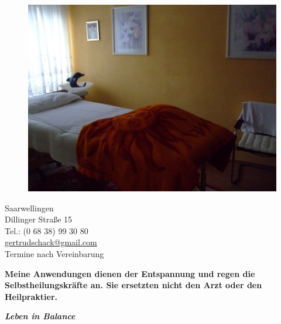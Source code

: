 \documentclass[10pt,foldmark,notumble]{leaflet}
\begin{document}
\begin{figure}[h]
\includegraphics [scale=.25]{Raum_alt.jpg}
\end{figure}


\vspace*{7mm}
\begin{flushleft}
Saarwellingen\\
Dillinger Straße 15\\
Tel.: (0 68 38) 99 30 80\\
\href{mailto:gertrudschack@gmail.com}{gertrudschack@gmail.com} \\
\vspace{2mm}
\large{Termine nach Vereinbarung} %
\end{flushleft}

{\bf Meine Anwendungen dienen der Entspannung und regen die Selbstheilungskräfte an. Sie ersetzten nicht den Arzt oder den Heilpraktier. }


\newpage

\centerline {\LARGE {\bf \it {Leben in Balance}}}
\end{document}
